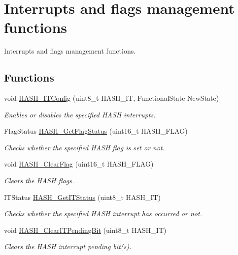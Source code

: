 \hypertarget{group___h_a_s_h___group5}{\section{Interrupts and flags management functions}
\label{group___h_a_s_h___group5}
}


Interrupts and flags management functions.  


\subsection*{Functions}
\begin{DoxyCompactItemize}
\item 
void \hyperlink{group___h_a_s_h___group5_gaed111ba67a4f4afc8c9cf389adc574ac}{H\-A\-S\-H\-\_\-\-I\-T\-Config} (uint8\-\_\-t H\-A\-S\-H\-\_\-\-I\-T, Functional\-State New\-State)
\begin{DoxyCompactList}\small\item\em Enables or disables the specified H\-A\-S\-H interrupts. \end{DoxyCompactList}\item 
Flag\-Status \hyperlink{group___h_a_s_h___group5_gae994fb4be1977f6ebb823f38839f7bd1}{H\-A\-S\-H\-\_\-\-Get\-Flag\-Status} (uint16\-\_\-t H\-A\-S\-H\-\_\-\-F\-L\-A\-G)
\begin{DoxyCompactList}\small\item\em Checks whether the specified H\-A\-S\-H flag is set or not. \end{DoxyCompactList}\item 
void \hyperlink{group___h_a_s_h___group5_ga0ec1269a1f30a1e7be0e3045d72ebcf6}{H\-A\-S\-H\-\_\-\-Clear\-Flag} (uint16\-\_\-t H\-A\-S\-H\-\_\-\-F\-L\-A\-G)
\begin{DoxyCompactList}\small\item\em Clears the H\-A\-S\-H flags. \end{DoxyCompactList}\item 
I\-T\-Status \hyperlink{group___h_a_s_h___group5_ga49a9d1ad196112cd3614b8c428a4c4cf}{H\-A\-S\-H\-\_\-\-Get\-I\-T\-Status} (uint8\-\_\-t H\-A\-S\-H\-\_\-\-I\-T)
\begin{DoxyCompactList}\small\item\em Checks whether the specified H\-A\-S\-H interrupt has occurred or not. \end{DoxyCompactList}\item 
void \hyperlink{group___h_a_s_h___group5_ga97b9508f09c6fb572f65832f124da26d}{H\-A\-S\-H\-\_\-\-Clear\-I\-T\-Pending\-Bit} (uint8\-\_\-t H\-A\-S\-H\-\_\-\-I\-T)
\begin{DoxyCompactList}\small\item\em Clears the H\-A\-S\-H interrupt pending bit(s). \end{DoxyCompactList}\end{DoxyCompactItemize}


